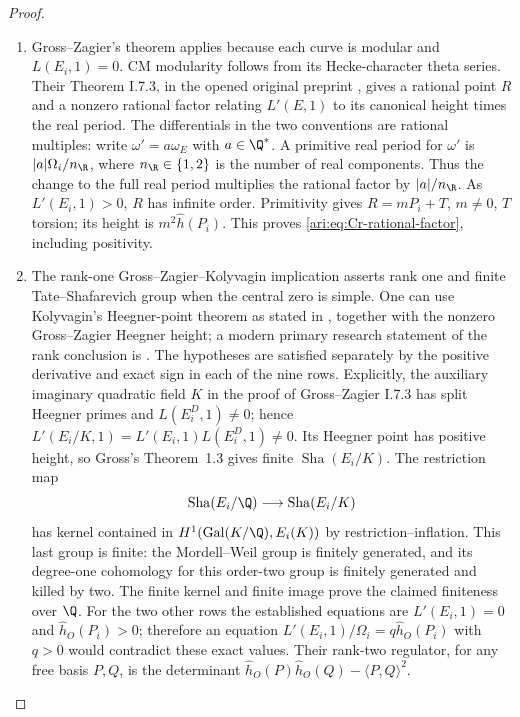 \begin{proof}

\begin{enumerate}[label=\arabic*.,leftmargin=*]
\item Gross--Zagier's theorem applies because each curve is modular and
$L(E_i,1)=0$. CM modularity follows from its Hecke-character
theta series. Their Theorem I.7.3, in the opened original
preprint \citep{CrGrossZagier1986}, gives a rational point $R$ and
a nonzero rational factor relating $L'(E,1)$ to its canonical
height times the real period. The differentials in the two conventions are rational multiples:
write $\omega'=a\omega_E$ with $a\in\Q^*$.  A primitive real
period for $\omega'$ is $|a|\Omega_i/n_{\R}$, where
$n_{\R}\in\{1,2\}$ is the number of real components.
Thus the change to the full real period multiplies the rational
factor by $|a|/n_{\R}$.
As $L'(E_i,1)>0$, $R$ has infinite order. Primitivity gives
$R=mP_i+T$, $m\ne0$, $T$ torsion; its height is
$m^2\widehat h(P_i)$. This proves
\eqref{ari:eq:Cr-rational-factor}, including positivity.

\item The rank-one Gross--Zagier--Kolyvagin implication asserts rank one
and finite Tate--Shafarevich group when the central zero is simple.
One can use Kolyvagin's Heegner-point theorem as stated in
\citet[Theorem 1.3]{CrGross1991}, together with the nonzero
Gross--Zagier Heegner height; a modern primary research statement
of the rank conclusion is \citet[Theorem 1.1]{CrJetchev2008}.
The hypotheses are satisfied separately by the positive derivative
and exact sign in each of the nine rows.  Explicitly, the auxiliary
imaginary quadratic field $K$ in the proof of Gross--Zagier I.7.3
has split Heegner primes and $L(E_i^D,1)\ne0$; hence
$L'(E_i/K,1)=L'(E_i,1)L(E_i^D,1)\ne0$.  Its Heegner point has
positive height, so Gross's Theorem~1.3 gives finite
$\operatorname{Sha}(E_i/K)$.  The restriction map
\[
\operatorname{Sha}(E_i/\Q)\longrightarrow
\operatorname{Sha}(E_i/K)
\]
has kernel contained in
$H^1(\operatorname{Gal}(K/\Q),E_i(K))$ by restriction--inflation.
This last group is finite: the Mordell--Weil group is finitely
generated, and its degree-one cohomology for this order-two group
is finitely generated and killed by two.  The finite kernel and
finite image prove the claimed finiteness over $\Q$.
For the two other rows the established equations are
$L'(E_i,1)=0$ and $\widehat h_O(P_i)>0$; therefore an equation
$L'(E_i,1)/\Omega_i=q\widehat h_O(P_i)$ with $q>0$ would contradict
these exact values.  Their rank-two regulator, for any free basis
$P,Q$, is the determinant
$\widehat h_O(P)\widehat h_O(Q)-\langle P,Q\rangle^2$.
\end{enumerate}

\end{proof}

